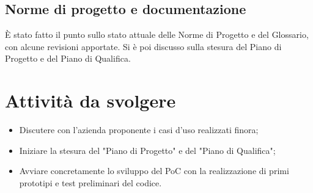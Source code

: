 \documentclass[10pt]{article}
\begin{document}
    \subsection{Norme di progetto e documentazione}
    È stato fatto il punto sullo stato attuale delle Norme di Progetto e del Glossario, con alcune revisioni apportate. Si è poi discusso sulla stesura del Piano di Progetto e del Piano di Qualifica.
    
    \section{Attività da svolgere}
    \begin{itemize}
        \item Discutere con l'azienda proponente i casi d'uso realizzati finora;
        \item Iniziare la stesura del "Piano di Progetto" e del "Piano di Qualifica";
        \item Avviare concretamente lo sviluppo del PoC con la realizzazione di primi prototipi e test preliminari del codice.
    \end{itemize}



     
\end{document}
